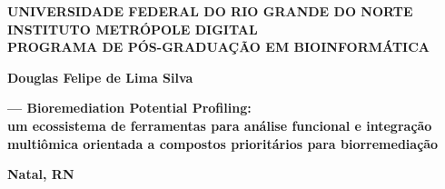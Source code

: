 \begin{titlepage}
\begin{center}
\textbf{UNIVERSIDADE FEDERAL DO RIO GRANDE DO NORTE} \\
\textbf{INSTITUTO METRÓPOLE DIGITAL} \\
\textbf{PROGRAMA DE PÓS-GRADUAÇÃO EM BIOINFORMÁTICA}
\vfill

\textbf{Douglas Felipe de Lima Silva}
\vfill

{\Large \textbf{\biorempp{} --- Bioremediation Potential Profiling:}} \\
\vspace{0.3cm}
{\large \textbf{um ecossistema de ferramentas para análise funcional e integração multiômica orientada a compostos prioritários para biorremediação}}
\vfill

\textbf{Natal, RN} \\
\textbf{\the\year}
\end{center}
\end{titlepage}

